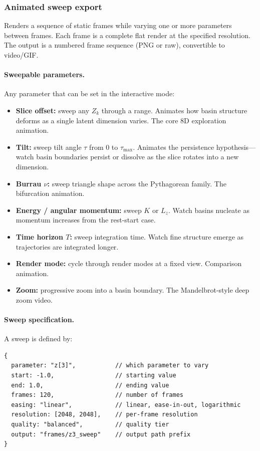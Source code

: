 \documentclass[11pt]{report}
\begin{document}

\subsubsection{Animated sweep export}

Renders a sequence of static frames while varying one or more parameters between frames. Each frame is a complete flat render at the specified resolution. The output is a numbered frame sequence (PNG or raw), convertible to video/GIF.

\paragraph{Sweepable parameters.} Any parameter that can be set in the interactive mode:
\begin{itemize}[nosep]
\item \textbf{Slice offset:} sweep any $Z_k$ through a range. Animates how basin structure deforms as a single latent dimension varies. The core 8D exploration animation.
\item \textbf{Tilt:} sweep tilt angle $\tau$ from 0 to $\tau_{\max}$. Animates the persistence hypothesis---watch basin boundaries persist or dissolve as the slice rotates into a new dimension.
\item \textbf{Burrau $\nu$:} sweep triangle shape across the Pythagorean family. The bifurcation animation.
\item \textbf{Energy / angular momentum:} sweep $K$ or $L_z$. Watch basins nucleate as momentum increases from the rest-start case.
\item \textbf{Time horizon $T$:} sweep integration time. Watch fine structure emerge as trajectories are integrated longer.
\item \textbf{Render mode:} cycle through render modes at a fixed view. Comparison animation.
\item \textbf{Zoom:} progressive zoom into a basin boundary. The Mandelbrot-style deep zoom video.
\end{itemize}

\paragraph{Sweep specification.} A sweep is defined by:
\begin{verbatim}
{
  parameter: "z[3]",           // which parameter to vary
  start: -1.0,                 // starting value
  end: 1.0,                    // ending value
  frames: 120,                 // number of frames
  easing: "linear",            // linear, ease-in-out, logarithmic
  resolution: [2048, 2048],    // per-frame resolution
  quality: "balanced",         // quality tier
  output: "frames/z3_sweep"    // output path prefix
}
\end{verbatim}
\end{document}
